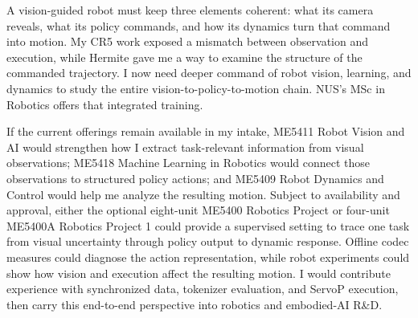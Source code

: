 A vision-guided robot must keep three elements coherent: what its camera reveals, what its policy commands, and how its dynamics turn that command into motion. My CR5 work exposed a mismatch between observation and execution, while Hermite gave me a way to examine the structure of the commanded trajectory. I now need deeper command of robot vision, learning, and dynamics to study the entire vision-to-policy-to-motion chain. NUS's MSc in Robotics offers that integrated training.

If the current offerings remain available in my intake, ME5411 Robot Vision and AI would strengthen how I extract task-relevant information from visual observations; ME5418 Machine Learning in Robotics would connect those observations to structured policy actions; and ME5409 Robot Dynamics and Control would help me analyze the resulting motion. Subject to availability and approval, either the optional eight-unit ME5400 Robotics Project or four-unit ME5400A Robotics Project 1 could provide a supervised setting to trace one task from visual uncertainty through policy output to dynamic response. Offline codec measures could diagnose the action representation, while robot experiments could show how vision and execution affect the resulting motion. I would contribute experience with synchronized data, tokenizer evaluation, and ServoP execution, then carry this end-to-end perspective into robotics and embodied-AI R\&D.
